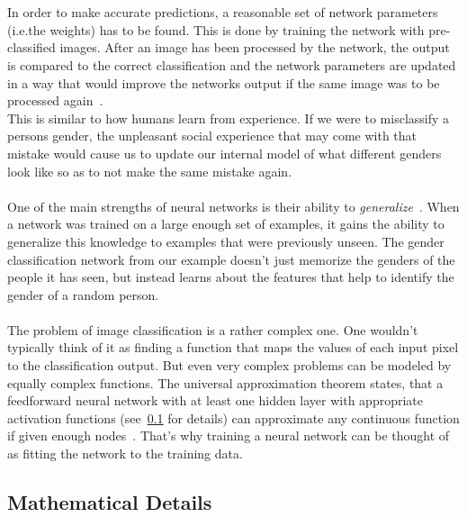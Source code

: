 \\
\\
In order to make accurate predictions, a reasonable set of network parameters (i.e.the weights) has to be found.
This is done by training the network with pre-classified images.
After an image has been processed by the network, the output is compared to the correct classification and the network parameters are updated in a way that would improve the networks output if the same image was to be processed again~\cite[chapter 1.2]{aggarwal_neural_2018,ibm_nn}.
\\
This is similar to how humans learn from experience.
If we were to misclassify a persons gender, the unpleasant social experience that may come with that mistake would cause us to update our internal model of what different genders look like so as to not make the same mistake again.
\\
\\
One of the main strengths of neural networks is their ability to \textit{generalize}~\cite{gonfalonieri_understand_2020}.
When a network was trained on a large enough set of examples, it gains the ability to generalize this knowledge to examples that were previously unseen.
The gender classification network from our example doesn't just memorize the genders of the people it has seen, but instead learns about the features that help to identify the gender of a random person.
\\
\\
The problem of image classification is a rather complex one.
One wouldn't typically think of it as finding a function that maps the values of each input pixel to the classification output.
But even very complex problems can be modeled by equally complex functions.
The universal approximation theorem states, that a feedforward neural network with at least one hidden layer with appropriate activation functions (see~\ref{subsec:nn-mathematical-details} for details) can approximate any continuous function if given enough nodes~\cite[chapter 6.4.1]{goodfellow_deep_2016}.
That's why training a neural network can be thought of as fitting the network to the training data.
\\
\subsection{Mathematical Details}
\label{subsec:nn-mathematical-details}
